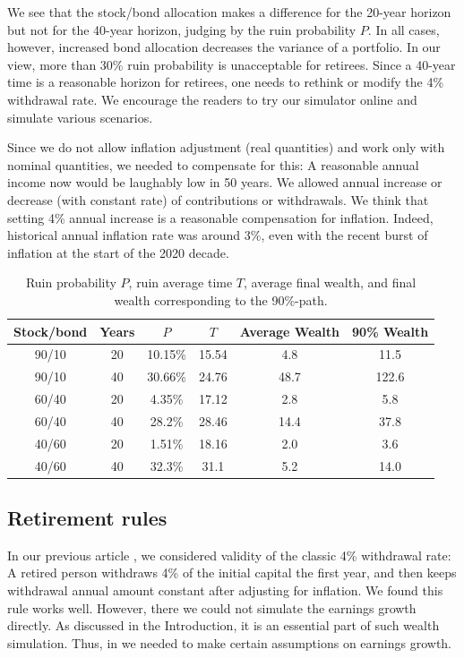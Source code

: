 \documentclass[12pt]{amsart}
\begin{document}
We see that the stock/bond allocation makes a difference for the 20-year horizon but not for the 40-year horizon, judging by the ruin probability $P$. In all cases, however, increased bond allocation decreases the variance of a portfolio. In our view, more than 30\% ruin probability is unacceptable for retirees. Since a 40-year time is a reasonable horizon for retirees, one needs to rethink or modify the 4\% withdrawal rate. We encourage the readers to try our simulator online and simulate various scenarios. 

Since we do not allow inflation adjustment (real quantities) and work only with nominal quantities, we needed to compensate for this: A reasonable annual income now would be laughably low in 50 years. We allowed annual increase or decrease (with constant rate) of contributions or withdrawals. We think that setting 4\% annual increase is a reasonable compensation for inflation. Indeed, historical annual inflation rate was around 3\%, even with the recent burst of inflation at the start of the 2020 decade.

\begin{table}
\centering
\begin{tabular}{|c|c|c|c|c|c|}
\hline
Stock/bond & Years & $P$ & $T$ & Average Wealth & 90\% Wealth \\
\hline
90/10 & 20 & 10.15\% & 15.54 & 4.8 &  11.5 \\
\hline 
90/10 & 40 & 30.66\% & 24.76 & 48.7 & 122.6 \\
\hline
60/40 & 20 & 4.35\% & 17.12 & 2.8 & 5.8 \\
\hline
60/40 & 40 & 28.2\% & 28.46 & 14.4 & 37.8 \\
\hline
40/60 & 20 & 1.51\% & 18.16 & 2.0 & 3.6\\
\hline
40/60 & 40 & 32.3\% & 31.1 & 5.2 & 14.0\\
\hline
\end{tabular}
\caption{Ruin probability $P$, ruin average time $T$, average final wealth, and final wealth corresponding to the 90\%-path.}
\label{table:critical}
\end{table}

\subsection{Retirement rules} In our previous article \cite{Valuation}, we considered validity of the classic 4\% withdrawal rate: A retired person withdraws 4\% of the initial capital the first year, and then keeps withdrawal annual amount constant after adjusting for inflation. We found this rule works well. However, there we could not simulate the earnings growth directly. As discussed in the Introduction, it is an essential part of such wealth simulation. Thus, in \cite{Valuation} we needed to make certain assumptions on earnings growth.  
\end{document}
